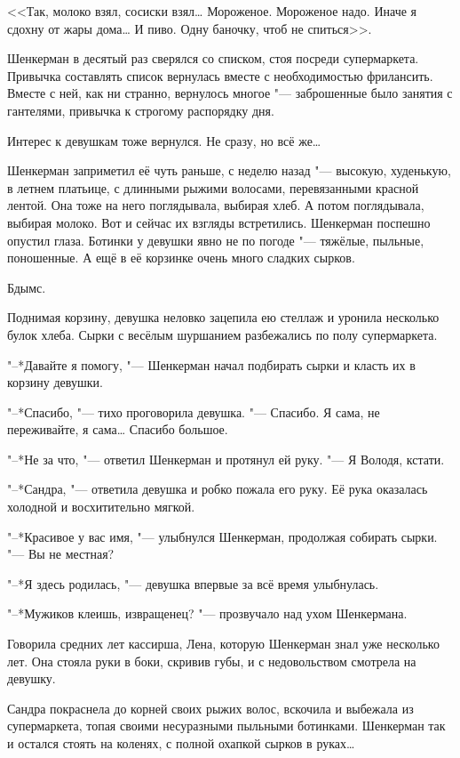 <<Так, молоко взял, сосиски взял\ldots{}
Мороженое.
Мороженое надо.
Иначе я сдохну от жары дома\ldots{}
И пиво.
Одну баночку, чтоб не спиться>>.

Шенкерман в десятый раз сверялся со списком, стоя посреди супермаркета.
Привычка составлять список вернулась вместе с необходимостью фрилансить.
Вместе с ней, как ни странно, вернулось многое "--- заброшенные было занятия с гантелями, привычка к строгому распорядку дня.

Интерес к девушкам тоже вернулся.
Не сразу, но всё же\ldots{}

Шенкерман заприметил её чуть раньше, с неделю назад "--- высокую, худенькую, в летнем платьице, с длинными рыжими волосами, перевязанными красной лентой.
Она тоже на него поглядывала, выбирая хлеб.
А потом поглядывала, выбирая молоко.
Вот и сейчас их взгляды встретились.
Шенкерман поспешно опустил глаза.
Ботинки у девушки явно не по погоде "--- тяжёлые, пыльные, поношенные.
А ещё в её корзинке очень много сладких сырков.

Бдымс.

Поднимая корзину, девушка неловко зацепила ею стеллаж и уронила несколько булок хлеба.
Сырки с весёлым шуршанием разбежались по полу супермаркета.

"--*Давайте я помогу, "--- Шенкерман начал подбирать сырки и класть их в корзину девушки.

"--*Спасибо, "--- тихо проговорила девушка.
"--- Спасибо.
Я сама, не переживайте, я сама\ldots{}
Спасибо большое.

"--*Не за что, "--- ответил Шенкерман и протянул ей руку.
"--- Я Володя, кстати.

"--*Сандра, "--- ответила девушка и робко пожала его руку.
Её рука оказалась холодной и восхитительно мягкой.

"--*Красивое у вас имя, "--- улыбнулся Шенкерман, продолжая собирать сырки.
"--- Вы не местная?

"--*Я здесь родилась, "--- девушка впервые за всё время улыбнулась.

"--*Мужиков клеишь, извращенец? "--- прозвучало над ухом Шенкермана.

Говорила средних лет кассирша, Лена, которую Шенкерман знал уже несколько лет.
Она стояла руки в боки, скривив губы, и с недовольством смотрела на девушку.

Сандра покраснела до корней своих рыжих волос, вскочила и выбежала из супермаркета, топая своими несуразными пыльными ботинками.
Шенкерман так и остался стоять на коленях, с полной охапкой сырков в руках\ldots{}

